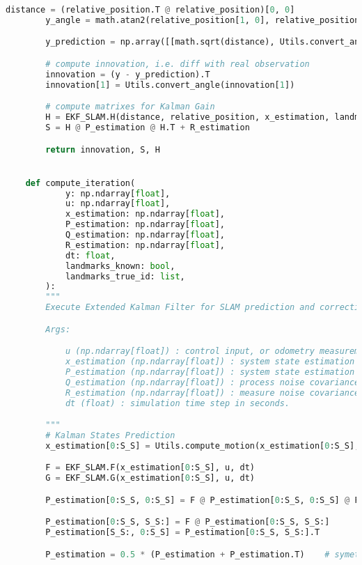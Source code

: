 \documentclass[../CSC_5RO12_TA_TP4.tex]{subfiles}
\begin{document}
\begin{scriptsize}
\begin{lstlisting}[language=Python]
        distance = (relative_position.T @ relative_position)[0, 0]
        y_angle = math.atan2(relative_position[1, 0], relative_position[0, 0]) - x_estimation[2, 0]

        y_prediction = np.array([[math.sqrt(distance), Utils.convert_angle(y_angle)]])

        # compute innovation, i.e. diff with real observation
        innovation = (y - y_prediction).T
        innovation[1] = Utils.convert_angle(innovation[1])

        # compute matrixes for Kalman Gain
        H = EKF_SLAM.H(distance, relative_position, x_estimation, landmark_index)
        S = H @ P_estimation @ H.T + R_estimation

        return innovation, S, H


    def compute_iteration(
            y: np.ndarray[float],
            u: np.ndarray[float],
            x_estimation: np.ndarray[float],
            P_estimation: np.ndarray[float],
            Q_estimation: np.ndarray[float],
            R_estimation: np.ndarray[float],
            dt: float,
            landmarks_known: bool,
            landmarks_true_id: list,
        ):
        """
        Execute Extended Kalman Filter for SLAM prediction and correction.

        Args:

            u (np.ndarray[float]) : control input, or odometry measurement, at instant k-1.
            x_estimation (np.ndarray[float]) : system state estimation at instant k-1.
            P_estimation (np.ndarray[float]) : system state estimation covariance at instant k-1.
            Q_estimation (np.ndarray[float]) : process noise covariance matrix at instant k-1.
            R_estimation (np.ndarray[float]) : measure noise covariance matrix at instant k-1.
            dt (float) : simulation time step in seconds.

        """
        # Kalman States Prediction
        x_estimation[0:S_S] = Utils.compute_motion(x_estimation[0:S_S], u, dt)

        F = EKF_SLAM.F(x_estimation[0:S_S], u, dt)
        G = EKF_SLAM.G(x_estimation[0:S_S], u, dt)

        P_estimation[0:S_S, 0:S_S] = F @ P_estimation[0:S_S, 0:S_S] @ F.T + G @ Q_estimation @ G.T

        P_estimation[0:S_S, S_S:] = F @ P_estimation[0:S_S, S_S:]
        P_estimation[S_S:, 0:S_S] = P_estimation[0:S_S, S_S:].T

        P_estimation = 0.5 * (P_estimation + P_estimation.T)    # symetry matrix



\end{lstlisting}
\end{scriptsize}
\end{document}
